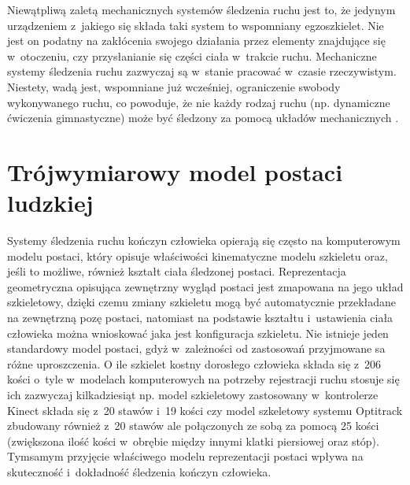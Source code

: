 Niewątpliwą zaletą mechanicznych systemów śledzenia ruchu jest to, że jedynym urządzeniem z~jakiego się składa taki system to wspomniany egzoszkielet. Nie jest on podatny na zakłócenia swojego działania przez elementy znajdujące się w~otoczeniu, czy przysłanianie się części ciała w~trakcie ruchu. Mechaniczne systemy śledzenia ruchu zazwyczaj są w~stanie pracować w~czasie rzeczywistym. Niestety, wadą jest, wspomniane już wcześniej, ograniczenie swobody wykonywanego ruchu, co powoduje, że nie każdy rodzaj ruchu (np. dynamiczne ćwiczenia gimnastyczne) może być śledzony za pomocą układów mechanicznych .

\section{Trójwymiarowy model postaci ludzkiej} \label{chap:bodyRep}
Systemy śledzenia ruchu kończyn człowieka opierają się często na komputerowym modelu postaci, który opisuje właściwości kinematyczne modelu szkieletu oraz, jeśli to możliwe, również kształt ciała śledzonej postaci. Reprezentacja geometryczna opisująca zewnętrzny wygląd postaci jest zmapowana na jego układ szkieletowy, dzięki czemu zmiany szkieletu mogą być automatycznie przekładane na zewnętrzną pozę postaci, natomiast na podstawie kształtu i~ustawienia ciała człowieka można wnioskować jaka jest konfiguracja szkieletu. 
Nie istnieje jeden standardowy model postaci, gdyż w~zależności od zastosowań przyjmowane sa różne uproszczenia. O ile szkielet kostny dorosłego człowieka składa się z~206 kości \cite{Lasinski1990} o~tyle w~modelach komputerowych na potrzeby rejestracji ruchu stosuje się ich zazwyczaj kilkadziesiąt np. model szkieletowy zastosowany w~kontrolerze Kinect składa się z~20 stawów i~19 kości\cite{msdn:kinectSkeleton} czy model szkeletowy systemu Optitrack zbudowany również z~20 stawów ale połączonych ze sobą za pomocą 25 kości\cite{optitrackSkeleton} (zwiększona ilość kości w~obrębie między innymi klatki piersiowej oraz stóp). Tymsamym przyjęcie właściwego modelu reprezentacji postaci wpływa na skuteczność i~dokładność śledzenia kończyn człowieka.

